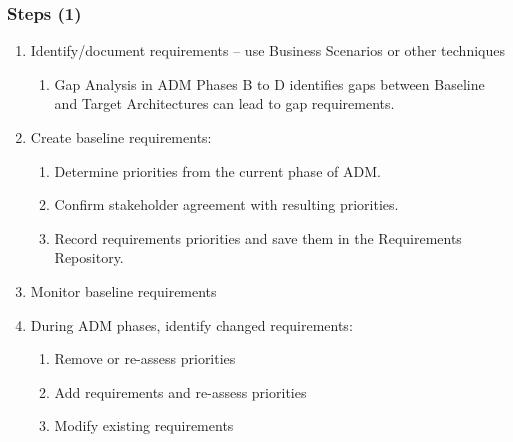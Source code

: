 \documentclass[aspectratio=169, table]{beamer}
\begin{document}
	\begin{frame}
		\frametitle{Steps (1)}
		\vspace{20pt}
		\begin{enumerate}
			\item Identify/document requirements – use Business Scenarios or other techniques
			\begin{enumerate}
				\item Gap Analysis in ADM Phases B to D identifies gaps between Baseline and Target Architectures can lead to gap requirements.
			\end{enumerate}
			\item Create baseline requirements:
			\begin{enumerate}
				\item Determine priorities from the current phase of ADM.
				\item Confirm stakeholder agreement with resulting priorities.
				\item Record requirements priorities and save them in the Requirements Repository.
			\end{enumerate}
			\item Monitor baseline requirements
			 \item During ADM phases, identify changed requirements:
			\begin{enumerate}
				\item Remove or re-assess priorities
				\item Add requirements and re-assess priorities
				\item Modify existing requirements
			\end{enumerate}
		\end{enumerate}
	\end{frame}
	
\end{document}
